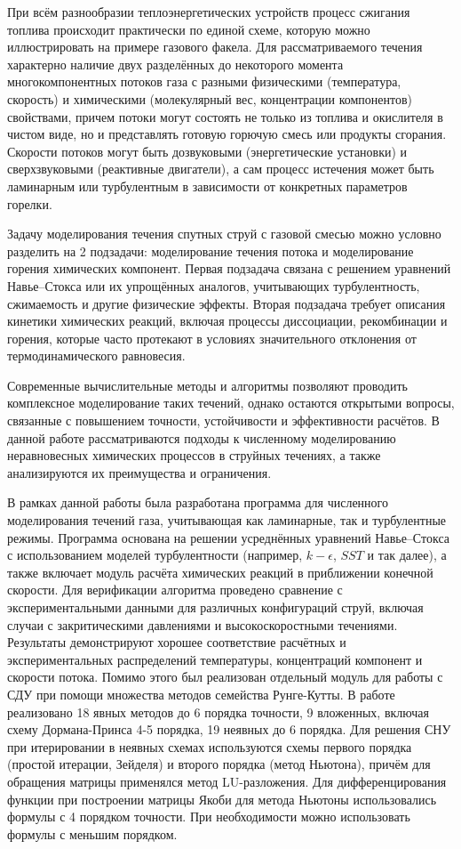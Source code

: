 \introduction %

При всём разнообразии теплоэнергетических устройств процесс сжигания топлива происходит практически по единой схеме, которую можно иллюстрировать на примере газового факела. Для рассматриваемого течения характерно наличие двух разделённых до некоторого момента многокомпонентных потоков газа с разными физическими (температура, скорость) и химическими (молекулярный вес, концентрации компонентов) свойствами, причем потоки могут состоять не только из топлива и окислителя в чистом виде, но и представлять готовую горючую смесь или продукты сгорания. Скорости потоков могут быть дозвуковыми (энергетические установки) и сверхзвуковыми (реактивные двигатели), а сам процесс истечения может быть ламинарным или турбулентным в зависимости от конкретных параметров горелки.

Задачу моделирования течения спутных струй с газовой смесью можно условно разделить на 2 подзадачи: моделирование течения потока и моделирование горения химических компонент. Первая подзадача связана с решением уравнений Навье–Стокса или их упрощённых аналогов, учитывающих турбулентность, сжимаемость и другие физические эффекты. Вторая подзадача требует описания кинетики химических реакций, включая процессы диссоциации, рекомбинации и горения, которые часто протекают в условиях значительного отклонения от термодинамического равновесия.

Современные вычислительные методы и алгоритмы позволяют проводить комплексное моделирование таких течений, однако остаются открытыми вопросы, связанные с повышением точности, устойчивости и эффективности расчётов. В данной работе рассматриваются подходы к численному моделированию неравновесных химических процессов в струйных течениях, а также анализируются их преимущества и ограничения.

В рамках данной работы была разработана программа для численного моделирования течений газа, учитывающая как ламинарные, так и турбулентные режимы. Программа основана на решении усреднённых уравнений Навье–Стокса с использованием моделей турбулентности (например, $k-\epsilon$, $SST$ и так далее), а также включает модуль расчёта химических реакций в приближении конечной скорости. Для верификации алгоритма проведено сравнение с экспериментальными данными для различных конфигураций струй, включая случаи с закритическими давлениями и высокоскоростными течениями. Результаты демонстрируют хорошее соответствие расчётных и экспериментальных распределений температуры, концентраций компонент и скорости потока. Помимо этого был реализован отдельный модуль для работы с СДУ при помощи множества методов семейства Рунге-Кутты. В работе реализовано 18 явных методов до 6 порядка точности, 9 вложенных, включая схему Дормана-Принса 4-5 порядка, 19 неявных до 6 порядка. Для решения СНУ при итерировании в неявных схемах используются схемы первого порядка (простой итерации, Зейделя) и второго порядка (метод Ньютона), причём для обращения матрицы применялся метод LU-разложения. Для дифференцирования функции при построении матрицы Якоби для метода Ньютоны использовались формулы с 4 порядком точности. При необходимости можно использовать формулы с меньшим порядком.

